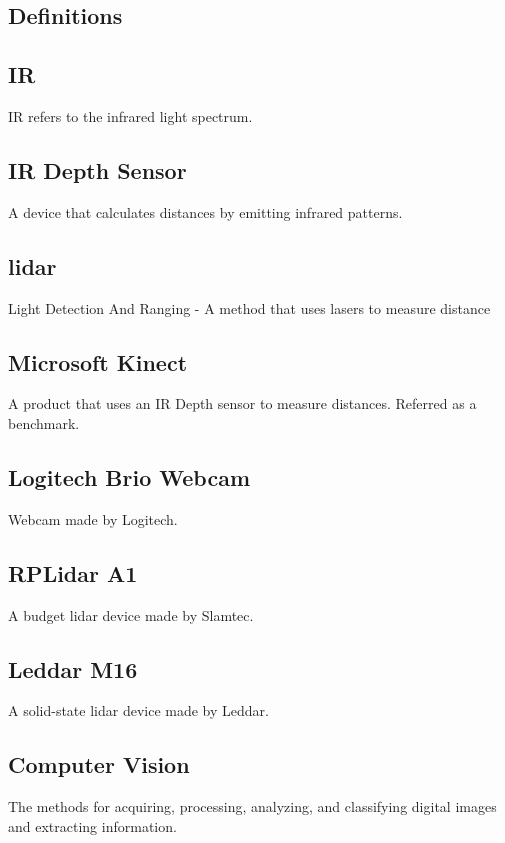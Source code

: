 \documentclass[onecolumn, draftclsnofoot,10pt, compsoc]{IEEEtran}
\begin{document}
\begin{singlespace}
	\section{Definitions}
		\subsection{IR}\label{def:IR}
		IR refers to the infrared light spectrum.

		\subsection{IR Depth Sensor}\label{def:depthsensor}
		A device that calculates distances by emitting infrared patterns. 
		
		\subsection{lidar}\label{def:lidar}
		Light Detection And Ranging - A method that uses lasers to measure distance
		
		\subsection{Microsoft Kinect}\label{def:kinect}
		A product that uses an IR Depth sensor to measure distances.
		Referred as a benchmark.
		
		\subsection{Logitech Brio Webcam}\label{def:brio}
		Webcam made by Logitech. \cite{logitech}
		
		\subsection{RPLidar A1}\label{def:rplidar}
		A budget lidar device made by Slamtec. \cite{slamtec}

		\subsection{Leddar M16}\label{def:m16}
		A solid-state lidar device made by Leddar. \cite{Leddartech}

		\subsection{Computer Vision }\label{def:vision}
		The methods for acquiring, processing, analyzing, and classifying digital images and extracting information.
		

\end{singlespace}
\end{document}
